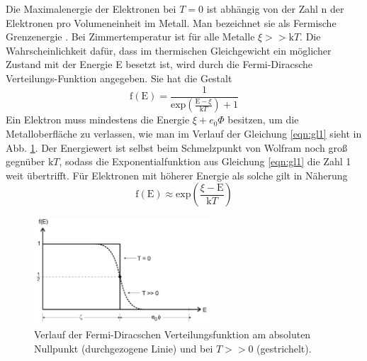 Die Maximalenergie der Elektronen bei $T = 0$ ist abhängig von der Zahl n der Elektronen pro Volumeneinheit im Metall.
Man bezeichnet sie als Fermische Grenzenergie \xi.
Bei Zimmertemperatur ist für alle Metalle $\xi >> \text{k}T$.
Die Wahrscheinlichkeit dafür, dass im thermischen Gleichgewicht ein möglicher Zustand mit der Energie E besetzt ist, wird durch die Fermi-Diracsche Verteilungs-Funktion angegeben.
Sie hat die Gestalt
\begin{equation}
    \text{f}(\text{E}) = \frac{1}{\text{exp}\left(\frac{\text{E} - \xi}{\text{k}T}\right) + 1}
    \label{eqn:gl1}
\end{equation}
Ein Elektron muss mindestens die Energie $\xi + e_0 \Phi$ besitzen, um die Metalloberfläche zu verlassen, wie man im Verlauf der Gleichung \eqref{eqn:gl1} sieht in Abb. \ref{fig:abb2}.
Der Energiewert ist selbst beim Schmelzpunkt von Wolfram noch groß gegnüber $\text{k}T$, sodass die Exponentialfunktion aus Gleichung \eqref{eqn:gl1} die Zahl 1 weit übertrifft.
Für Elektronen mit höherer Energie als solche gilt in Näherung
\begin{equation}
    \text{f}(\text{E}) \approx \text{exp}\left(\frac{\xi - \text{E}}{\text{k}T}\right)
    \label{eqn:gl2}
\end{equation}
\begin{figure}
    \centering
    \includegraphics[height=4.0cm]{data/abb2.jpg}
    \caption{Verlauf der Fermi-Diracschen Verteilungsfunktion am absoluten Nullpunkt (durchgezogene Linie) und bei $T >> 0$ (gestrichelt). \cite{V504}}
    \label{fig:abb2}
\end{figure} \\
\noindent

